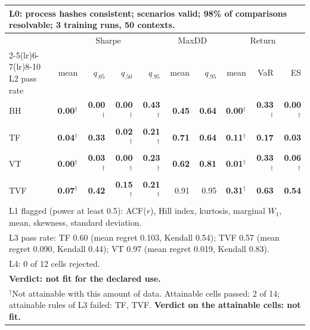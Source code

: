 \begin{tabular}{lrrrrrrrrr}
\toprule
\multicolumn{10}{p{13.5cm}}{L0: process hashes consistent; scenarios valid; 98\% of comparisons resolvable; 3 training runs, 50 contexts.} \\
\midrule
 & \multicolumn{4}{c}{Sharpe} & \multicolumn{2}{c}{MaxDD} & \multicolumn{3}{c}{Return} \\
\cmidrule(lr){2-5}\cmidrule(lr){6-7}\cmidrule(lr){8-10}
L2 pass rate & mean & $q_{.05}$ & $q_{.50}$ & $q_{.95}$ & mean & $q_{.95}$ & mean & VaR & ES \\
\midrule
BH & \textbf{0.00}$^{\dagger}$ & \textbf{0.00}$^{\dagger}$ & \textbf{0.00}$^{\dagger}$ & \textbf{0.43}$^{\dagger}$ & \textbf{0.45} & \textbf{0.64} & \textbf{0.00}$^{\dagger}$ & \textbf{0.33}$^{\dagger}$ & \textbf{0.00}$^{\dagger}$ \\
TF & \textbf{0.04}$^{\dagger}$ & \textbf{0.33} & \textbf{0.02}$^{\dagger}$ & \textbf{0.21}$^{\dagger}$ & \textbf{0.71} & \textbf{0.64} & \textbf{0.11}$^{\dagger}$ & \textbf{0.17} & \textbf{0.03} \\
VT & \textbf{0.00}$^{\dagger}$ & \textbf{0.03}$^{\dagger}$ & \textbf{0.00}$^{\dagger}$ & \textbf{0.23}$^{\dagger}$ & \textbf{0.62} & \textbf{0.81} & \textbf{0.01}$^{\dagger}$ & \textbf{0.33}$^{\dagger}$ & \textbf{0.06}$^{\dagger}$ \\
TVF & \textbf{0.07}$^{\dagger}$ & \textbf{0.42} & \textbf{0.15}$^{\dagger}$ & \textbf{0.21}$^{\dagger}$ & 0.91 & 0.95 & \textbf{0.31}$^{\dagger}$ & \textbf{0.63} & \textbf{0.54} \\
\midrule
\multicolumn{10}{p{13.5cm}}{L1 flagged (power at least 0.5): ACF($r$), Hill index, kurtosis, marginal $W_1$, mean, skewness, standard deviation.} \\
\multicolumn{10}{p{13.5cm}}{L3 pass rate: TF 0.60 (mean regret 0.103, Kendall 0.54); TVF 0.57 (mean regret 0.090, Kendall 0.44); VT 0.97 (mean regret 0.019, Kendall 0.83).} \\
\multicolumn{10}{p{13.5cm}}{L4: 0 of 12 cells rejected.} \\
\multicolumn{10}{p{13.5cm}}{\textbf{Verdict: not fit for the declared use.}} \\
\multicolumn{10}{p{13.5cm}}{$^{\dagger}$Not attainable with this amount of data. Attainable cells passed: 2 of 14; attainable rules of L3 failed: TF, TVF. \textbf{Verdict on the attainable cells: not fit.}} \\
\bottomrule
\end{tabular}
